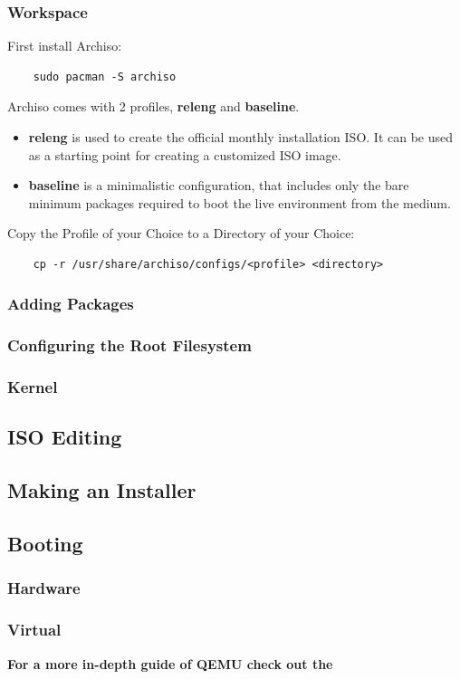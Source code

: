 \documentclass{article}
\begin{document}
\subsubsection{Workspace}
	First install Archiso:
	\begin{lstlisting}
	sudo pacman -S archiso
	\end{lstlisting}
	Archiso comes with 2 profiles, \textbf{releng} and \textbf{baseline}.
	\begin{itemize}
		\item \textbf{releng} is used to create the official monthly installation ISO. It can be used as a starting point for creating a customized ISO image.
    	\item \textbf{baseline} is a minimalistic configuration, that includes only the bare minimum packages required to boot the live environment from the medium.
	\end{itemize}
	Copy the Profile of your Choice to a Directory of your Choice:
	\begin{lstlisting}
	cp -r /usr/share/archiso/configs/<profile> <directory>
	\end{lstlisting}
\subsubsection{Adding Packages}
\subsubsection{Configuring the Root Filesystem}
\subsubsection{Kernel}
\subsection{ISO Editing}
\subsection{Making an Installer}
\subsection{Booting}
\subsubsection{Hardware}
\subsubsection{Virtual}
\textbf{For a more in-depth guide of QEMU check out the }
\end{document}
